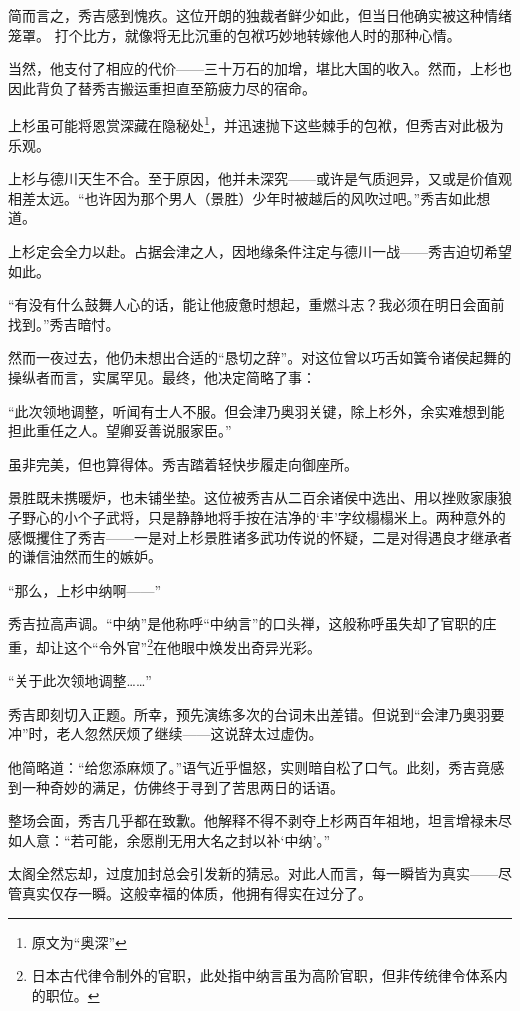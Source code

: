 \documentclass[
]{article}
\begin{document}
简而言之，秀吉感到愧疚。这位开朗的独裁者鲜少如此，但当日他确实被这种情绪笼罩。
打个比方，就像将无比沉重的包袱巧妙地转嫁他人时的那种心情。

当然，他支付了相应的代价------三十万石的加增，堪比大国的收入。然而，上杉也因此背负了替秀吉搬运重担直至筋疲力尽的宿命。

上杉虽可能将恩赏深藏在隐秘处\footnote{原文为``奥深''}，并迅速抛下这些棘手的包袱，但秀吉对此极为乐观。

上杉与德川天生不合。至于原因，他并未深究------或许是气质迥异，又或是价值观相差太远。``也许因为那个男人（景胜）少年时被越后的风吹过吧。''秀吉如此想道。

上杉定会全力以赴。占据会津之人，因地缘条件注定与德川一战------秀吉迫切希望如此。

``有没有什么鼓舞人心的话，能让他疲惫时想起，重燃斗志？我必须在明日会面前找到。''秀吉暗忖。

然而一夜过去，他仍未想出合适的``恳切之辞''。对这位曾以巧舌如簧令诸侯起舞的操纵者而言，实属罕见。最终，他决定简略了事：

``此次领地调整，听闻有士人不服。但会津乃奥羽关键，除上杉外，余实难想到能担此重任之人。望卿妥善说服家臣。''

虽非完美，但也算得体。秀吉踏着轻快步履走向御座所。

景胜既未携暖炉，也未铺坐垫。这位被秀吉从二百余诸侯中选出、用以挫败家康狼子野心的小个子武将，只是静静地将手按在洁净的`丰'字纹榻榻米上。两种意外的感慨攫住了秀吉------一是对上杉景胜诸多武功传说的怀疑，二是对得遇良才继承者的谦信油然而生的嫉妒。

``那么，上杉中纳啊------''

秀吉拉高声调。``中纳''是他称呼``中纳言''的口头禅，这般称呼虽失却了官职的庄重，却让这个``令外官''\footnote{日本古代律令制外的官职，此处指中纳言虽为高阶官职，但非传统律令体系内的职位。}在他眼中焕发出奇异光彩。

``关于此次领地调整\ldots\ldots{}''

秀吉即刻切入正题。所幸，预先演练多次的台词未出差错。但说到``会津乃奥羽要冲''时，老人忽然厌烦了继续------这说辞太过虚伪。

他简略道：``给您添麻烦了。''语气近乎愠怒，实则暗自松了口气。此刻，秀吉竟感到一种奇妙的满足，仿佛终于寻到了苦思两日的话语。

整场会面，秀吉几乎都在致歉。他解释不得不剥夺上杉两百年祖地，坦言增禄未尽如人意：``若可能，余愿削无用大名之封以补`中纳'。''

太阁全然忘却，过度加封总会引发新的猜忌。对此人而言，每一瞬皆为真实------尽管真实仅存一瞬。这般幸福的体质，他拥有得实在过分了。
\end{document}
